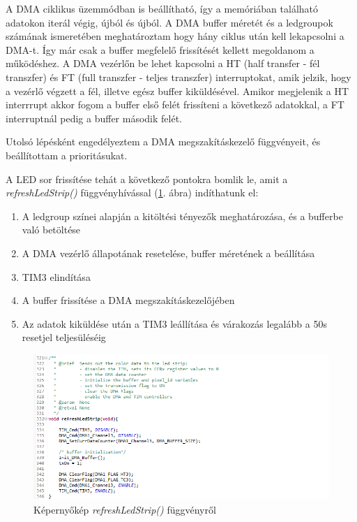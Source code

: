 \documentclass[../main.tex]{subfiles}
\begin{document}
             A DMA ciklikus üzemmódban is beállítható, így a memóriában található adatokon iterál végig, újból és újból. A DMA buffer méretét és a ledgroupok számának ismeretében meghatároztam hogy hány ciklus után kell lekapcsolni a DMA-t. Így már csak a buffer megfelelő frissítését kellett megoldanom a működéshez. A DMA vezérlőn be lehet kapcsolni a HT (half transfer - fél transzfer) és FT (full transzfer - teljes transzfer) interruptokat, amik jelzik, hogy a vezérlő végzett a fél, illetve egész buffer kiküldésével. Amikor megjelenik a HT interrrupt akkor fogom a buffer első felét frissíteni a következő adatokkal, a FT interruptnál pedig a buffer második felét.
             
             Utolsó lépésként engedélyeztem a DMA megszakításkezelő függvényeit, és beállítottam a prioritásukat.
             
             A LED sor frissítése tehát a következő pontokra bomlik le, amit a \textit{refreshLedStrip()} függvényhívással (\ref{fig:ws2811_refreshledstrip}. ábra) indíthatunk el:
            \begin{enumerate}
                \item A ledgroup színei alapján a kitöltési tényezők meghatározása, és a bufferbe való betöltése
                \item A DMA vezérlő állapotának resetelése, buffer méretének a beállítása
                \item TIM3 elindítása
                \item A buffer frissítése a DMA megszakításkezelőjében
                \item Az adatok kiküldése után a TIM3 leállítása és várakozás legalább a 50\micro s resetjel teljesüléséig
            \end{enumerate}
            
            \begin{figure}[h!]
                \centering
                    \includegraphics[width=14cm]{mbed_res/ws2811_refreshLedStrip}
                \caption{Képernyőkép \textit{refreshLedStrip()} függvényről}
                \label{fig:ws2811_refreshledstrip}
            \end{figure}
            
\end{document}
